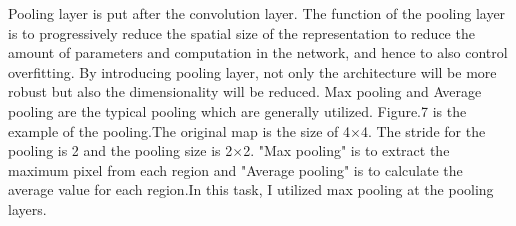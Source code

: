 Pooling layer is put after the convolution layer. %
The function of the pooling layer is to progressively reduce the spatial size of the representation to reduce the amount of parameters and computation in the network, and hence to also control overfitting.
By introducing pooling layer, not only the architecture will be more robust but also the dimensionality will be reduced. Max pooling and Average pooling are the typical pooling which are generally utilized. Figure.7 is the example of the pooling.The original map is the size of 4$\times$4. The stride for the pooling is 2 and the pooling size is 2$\times$2. "Max pooling" is to extract the maximum pixel from each region and "Average pooling" is to calculate the average value for each region.In this task, I utilized max pooling at the pooling layers.


